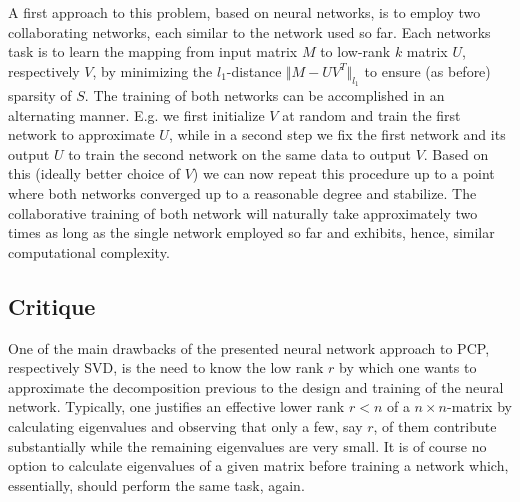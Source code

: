 A first approach to this problem, based on neural networks, is to employ two collaborating networks, each similar to the network used so far. Each networks task is to learn the mapping from input matrix $M$ to low-rank $k$ matrix $U$, respectively $V$, by minimizing the $l_1$-distance $\Vert M- UV^T\Vert_{l_1}$ to ensure (as before) sparsity of $S$. The training of both networks can be accomplished in an alternating manner. E.g. we first initialize $V$ at random and train the first network to approximate $U$, while in a second step we fix the first network and its output $U$ to train the second network on the same data to output $V$. Based on this (ideally better choice of $V$) we can now repeat this procedure up to a point where both networks converged up to a reasonable degree and stabilize. The collaborative training of both network will naturally take approximately two times as long as the single network employed so far and exhibits, hence, similar computational complexity. 

\subsection{Critique}
One of the main drawbacks of the presented neural network approach to PCP, respectively SVD, is the need to know the low rank $r$ by which one wants to approximate the decomposition previous to the design and training of the neural network. Typically, one justifies an effective lower rank $r<n$ of a $n\times n$-matrix by calculating eigenvalues and observing that only a few, say $r$, of them contribute substantially while the remaining eigenvalues are very small. It is of course no option to calculate eigenvalues of a given matrix before training a network which, essentially, should perform the same task, again.
